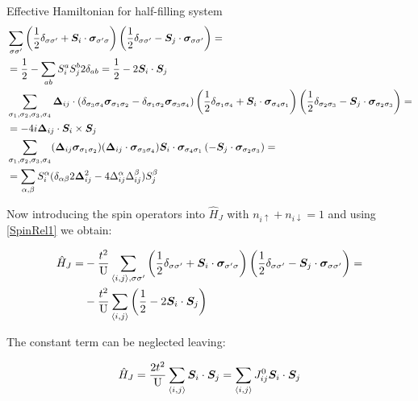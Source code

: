 \begin{section}{Effective Hamiltonian for half-filling system}
\begin{align}
&\sum_{\sigma \sigma'} \left(\frac{1}{2}\delta_{\sigma \sigma'} + \boldsymbol{S}_i\cdot\boldsymbol{\sigma}_{\sigma' \sigma}\right)\left(\frac{1}{2}\delta_{\sigma \sigma'}-\boldsymbol{S}_j\cdot\boldsymbol{\sigma}_{\sigma \sigma'}\right) = \nonumber \\
&=\frac{1}{2} - \sum_{ab} S_i^aS_j^b	2\delta_{ab} = \frac{1}{2} - 2\boldsymbol{S}_i\cdot\boldsymbol{S}_j \label{SpinRel1} \\
&\sum_{\sigma_1, \sigma_2, \sigma_3, \sigma_4}\boldsymbol{\Delta}_{ij}\cdot(\delta_{\sigma_3 \sigma_4}\boldsymbol{\sigma}_{\sigma_1 \sigma_2} - \delta_{\sigma_1 \sigma_2} \boldsymbol{\sigma}_{\sigma_3\sigma_4})\left(\frac{1}{2}\delta_{\sigma_1 \sigma_4} + \boldsymbol{S}_i\cdot\boldsymbol{\sigma}_{\sigma_4 \sigma_1}\right)\left(\frac{1}{2}\delta_{\sigma_2 \sigma_3}-\boldsymbol{S}_j\cdot\boldsymbol{\sigma}_{\sigma_2 \sigma_3}\right) = \nonumber \\
&= -4i \boldsymbol{\Delta}_{ij}\cdot \boldsymbol{S}_i \times \boldsymbol{S}_j \label{SpinRel2} \\
& \sum_{\sigma_1, \sigma_2, \sigma_3, \sigma_4} (\boldsymbol{\Delta}_{ij}\boldsymbol{\sigma}_{\sigma_1 \sigma_2})(\boldsymbol{\Delta}_{ij} \cdot\boldsymbol{\sigma}_{\sigma_3 \sigma_4})\boldsymbol{S}_i\cdot\boldsymbol{\sigma}_{\sigma_4 \sigma_1}\left(-\boldsymbol{S}_j\cdot\boldsymbol{\sigma}_{\sigma_2 \sigma_3}\right) = \nonumber \\
&= \sum_{\alpha, \beta} S_i^\alpha (\delta_{\alpha \beta} 2\boldsymbol{\Delta}_{ij}^2 - 4\Delta_{ij}^\alpha\Delta_{ij}^\beta ) S_j^\beta \label{SpinRel3}
\end{align}

Now introducing the spin operators into  $\hat{H}_J$ with $n_{i \uparrow} + n_{i \downarrow} = 1$ and using \ref{SpinRel1} we obtain:

\begin{align*}
\hat{H}_{J} = &-\frac{t^2}{\text{U}} \sum_{\langle i,j \rangle, \sigma \sigma'} \left(\frac{1}{2}\delta_{\sigma \sigma'} + \boldsymbol{S}_i\cdot\boldsymbol{\sigma}_{\sigma' \sigma}\right)\left(\frac{1}{2}\delta_{\sigma \sigma'}-\boldsymbol{S}_j\cdot\boldsymbol{\sigma}_{\sigma \sigma'}\right) = \\
&-\frac{t^2}{\text{U}}\sum_{\langle i,j \rangle} \left( \frac{1}{2} - 2\boldsymbol{S}_i\cdot\boldsymbol{S}_j \right)
\end{align*}

The constant term can be neglected leaving:

\begin{equation}
\hat{H}_{J} = \frac{2t^2}{\text{U}} \sum_{\langle i,j \rangle} \boldsymbol{S}_i\cdot\boldsymbol{S}_j = \sum_{\langle i,j \rangle} J_{ij}^0 \boldsymbol{S}_i\cdot\boldsymbol{S}_j
\end{equation}


\end{section}
